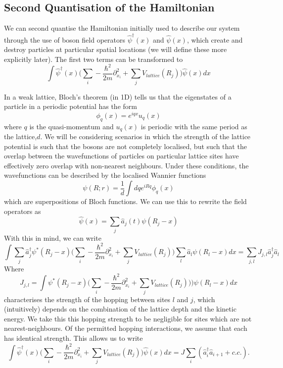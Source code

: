 \documentclass[a4paper,10pt]{article}
\begin{document}
\subsection{Second Quantisation of the Hamiltonian}
We can second quantise the Hamiltonian initially used to describe our system through the use of boson field operators $\hat{\psi}^{\dagger}(x)$ and $\hat{\psi}(x)$, which create and destroy 
particles at particular spatial locations (we will define these more explicitly later). The first two terms can be transformed to %
\begin{equation}
 \int  \hat{\psi}^{\dagger}(x) \bigg(  \sum_{i}-\frac{\hbar^{2}}{2m}  \partial_{x_{i}}^2+\sum_{j}V_{lattice}(R_{j})  \bigg)    \hat{\psi}(x)dx
\end{equation}

In a weak lattice, Bloch's theorem (in 1D) tells us that the eigenstates of a particle in a periodic potential has the form
\begin{equation}
 \phi_q(x)=e^{iqx}u_{q}(x)
\end{equation}
where $q$ is the quasi-momentum and $u_q(x)$ is periodic with the same period as the lattice,$d$. We will be considering scenarios in which the strength of the lattice potential
is such that the bosons are not completely localised, but such that the overlap between the wavefunctions of particles on particular lattice sites have effectively zero overlap 
with non-nearest neighbours. Under these conditions, the wavefunctions can be described by the localised Wannier functions
\begin{equation}
\psi(R;r)=\frac{1}{d}\int dq e^{iRq}\phi_q(x)
\end{equation}
which are superpositions of Bloch functions. We can use this to rewrite the field operators as 
\begin{equation}
 \hat{\psi}(x)=\sum_j \hat{a}_{j}(t)\psi(R_j-x)
\end{equation}
With this in mind, we can write
\begin{equation}
 \int  \sum_j\hat{a}_j^{\dagger}\psi^{*}(R_j-x) \bigg(  \sum_{i}-\frac{\hbar^{2}}{2m}  \partial_{x_{i}}^2+\sum_{j}V_{lattice}(R_{j})  \bigg)  \sum_l  \hat{a}_l\psi(R_l-x)dx=\sum_{j,l} J_{j,l}\hat{a}_{j}^{\dagger}\hat{a}_l
\end{equation}
Where
\begin{equation}
 J_{j,l}=\int  \psi^{*}(R_j-x) \bigg(  \sum_{i}-\frac{\hbar^{2}}{2m}  \partial_{x_{i}}^2+\sum_{j}V_{lattice}(R_{j}))  \bigg)  \psi(R_l-x)dx
\end{equation}
characterises the strength of the hopping between sites $l$ and $j$, which (intuitively) depends on the combination of the lattice depth and the kinetic energy. We take this this hopping strength to be negligible
for sites which are not nearest-neighbours. Of the permitted hopping interactions, we assume that each has identical strength. This allows us to write
\begin{equation}
 \int  \hat{\psi}^{\dagger}(x) \bigg(  \sum_{i}-\frac{\hbar^{2}}{2m}  \partial_{x_{i}}^2+\sum_{j}V_{lattice}(R_{j})  \bigg)    \hat{\psi}(x)dx=J\sum_{i}(\hat{a}^\dagger_{i}\hat{a}_{i+1}+c.c.).
\end{equation}
\end{document}
